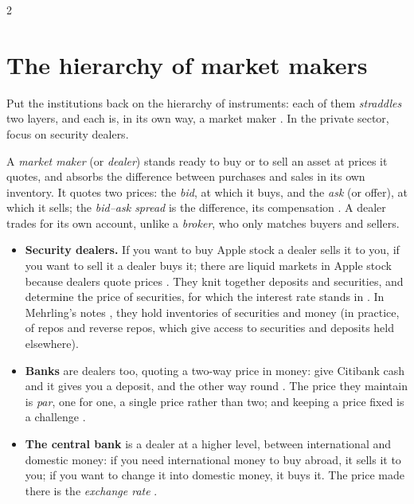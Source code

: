\begin{paracol}{2}
\section{The hierarchy of market makers}\label{sec:nh-marketmakers}

Put the institutions back on the hierarchy of instruments: each of them \emph{straddles} two layers, and each is, in
its own way, a market maker . In the private sector, focus on security dealers.

\begin{definition}\label{def:nh-mm}
A \emph{market maker} (or \emph{dealer}) stands ready to buy or to sell an asset at prices it quotes, and absorbs the
difference between purchases and sales in its own inventory. It quotes two prices: the \emph{bid}, at which it buys,
and the \emph{ask} (or offer), at which it sells; the \emph{bid--ask spread} is the difference, its compensation
. A dealer trades for its own account, unlike a \emph{broker}, who only matches buyers and sellers.
\end{definition}

\begin{itemize}
  \item \textbf{Security dealers.} If you want to buy Apple stock a dealer sells it to you, if you want to sell it a
        dealer buys it; there are liquid markets in Apple stock because dealers quote prices
        . They knit together deposits and securities, and determine the price of securities, for which
        the interest rate stands in . In Mehrling's notes , they hold inventories of
        securities and money (in practice, of repos and reverse repos, which give access to securities and deposits
        held elsewhere).
  \item \textbf{Banks} are dealers too, quoting a two-way price in money: give Citibank cash and it gives you a
        deposit, and the other way round . The price they maintain is \emph{par}, one for one, a single
        price rather than two; and keeping a price fixed is a challenge .
  \item \textbf{The central bank} is a dealer at a higher level, between international and domestic money: if you need
        international money to buy abroad, it sells it to you; if you want to change it into domestic money, it buys
        it. The price made there is the \emph{exchange rate} .
\end{itemize}


\end{paracol}

